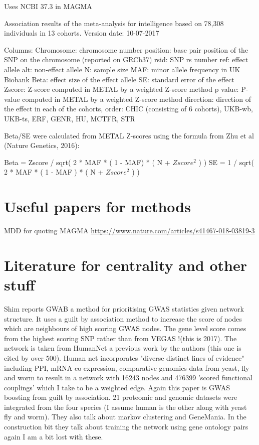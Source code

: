 Uses NCBI 37.3 in MAGMA

     Association results of the meta-analysis for intelligence based on 78,308 individuals in 13 cohorts. 
     Version date: 10-07-2017

  Columns:
Chromosome: chromosome number
position: base pair position of the SNP on the chromosome (reported on GRCh37)
rsid: SNP rs number
ref: effect allele
alt: non-effect allele
N: sample size
MAF: minor allele frequency in UK Biobank
Beta: effect size of the effect allele
SE: standard error of the effect
Zscore: Z-score computed in METAL by a weighted Z-score method
p   value: P-value computed in METAL by a weighted Z-score method
direction: direction of the effect in each of the cohorts, order: CHIC (consisting of 6 cohorts), UKB-wb, UKB-ts, ERF, GENR, HU, MCTFR, STR

Beta/SE were calculated from METAL Z-scores using the formula from Zhu et al (Nature Genetics, 2016):

Beta = Zscore / sqrt( 2 * MAF * ( 1 - MAF) * ( N + $Zscore^2$ ) )
SE = 1 / sqrt( 2 * MAF * ( 1 - MAF ) * ( N + $Zscore^2$ ) )

\section{Useful papers for methods}

MDD for quoting MAGMA \url{https://www.nature.com/articles/s41467-018-03819-3}

\section{Literature for centrality and other stuff}
\label{sec:literature centrality and other stuff}
Shim \cite{shim2017gwab} reports GWAB a method for prioritising GWAS statistics given network structure. It uses a guilt by association method to increase the score of nodes which are neighbours of high scoring GWAS nodes. The gene level score comes from the highest scoring SNP rather than from VEGAS !(this is 2017). The network is taken from HumanNet a previous work by the authors \cite{lee2011prioritizing} (this one is cited by over 500). Human net incorporates "diverse distinct lines of evidence" including PPI, mRNA co-expression, comparative genomics data from yeast, fly and worm to result in a network with 16243 nodes and 476399 'scored functional couplings' which I take to be a weighted edge. Again this paper is GWAS boosting from guilt by association. 21 proteomic and genomic datasets were integrated from the four species (I assume human is the other along with yeast fly and worm). They also talk about markov clustering and GeneMania. In the construction bit they talk about training the network using gene ontology pairs again I am a bit lost with these.  

